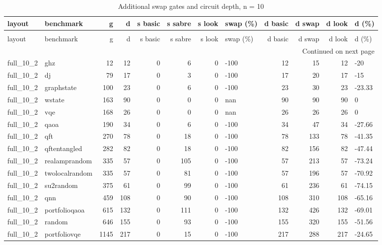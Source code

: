 \begin{longtable}{llrrrrrlrrrl}
\caption{Additional swap gates and circuit depth, n = 10} \label{benchmark-table-10} \\
\toprule
layout & benchmark & g & d & s basic & s sabre & s look & swap (\%) & d basic & d swap & d look & d (\%) \\
\midrule
\endfirsthead
\caption[]{Additional swap gates and circuit depth, n = 10} \\
\toprule
layout & benchmark & g & d & s basic & s sabre & s look & swap (\%) & d basic & d swap & d look & d (\%) \\
\midrule
\endhead
\midrule
\multicolumn{12}{r}{Continued on next page} \\
\midrule
\endfoot
\bottomrule
\endlastfoot
full\_10\_2 & ghz & 12 & 12 & 0 & 6 & 0 & -100 & 12 & 15 & 12 & -20 \\
full\_10\_2 & dj & 79 & 17 & 0 & 3 & 0 & -100 & 17 & 20 & 17 & -15 \\
full\_10\_2 & graphstate & 100 & 23 & 0 & 6 & 0 & -100 & 23 & 30 & 23 & -23.33 \\
full\_10\_2 & wstate & 163 & 90 & 0 & 0 & 0 & nan & 90 & 90 & 90 & 0 \\
full\_10\_2 & vqe & 168 & 26 & 0 & 0 & 0 & nan & 26 & 26 & 26 & 0 \\
full\_10\_2 & qaoa & 190 & 34 & 0 & 6 & 0 & -100 & 34 & 47 & 34 & -27.66 \\
full\_10\_2 & qft & 270 & 78 & 0 & 18 & 0 & -100 & 78 & 133 & 78 & -41.35 \\
full\_10\_2 & qftentangled & 282 & 82 & 0 & 18 & 0 & -100 & 82 & 156 & 82 & -47.44 \\
full\_10\_2 & realamprandom & 335 & 57 & 0 & 105 & 0 & -100 & 57 & 213 & 57 & -73.24 \\
full\_10\_2 & twolocalrandom & 335 & 57 & 0 & 81 & 0 & -100 & 57 & 196 & 57 & -70.92 \\
full\_10\_2 & su2random & 375 & 61 & 0 & 99 & 0 & -100 & 61 & 236 & 61 & -74.15 \\
full\_10\_2 & qnn & 459 & 108 & 0 & 90 & 0 & -100 & 108 & 310 & 108 & -65.16 \\
full\_10\_2 & portfolioqaoa & 615 & 132 & 0 & 111 & 0 & -100 & 132 & 426 & 132 & -69.01 \\
full\_10\_2 & random & 646 & 155 & 0 & 93 & 0 & -100 & 155 & 320 & 155 & -51.56 \\
full\_10\_2 & portfoliovqe & 1145 & 217 & 0 & 15 & 0 & -100 & 217 & 288 & 217 & -24.65 \\

\end{longtable}
